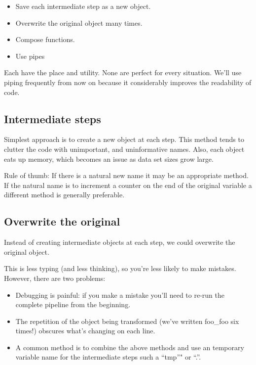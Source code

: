 \documentclass[]{book}
\providecommand{\tightlist}{%
  \setlength{\itemsep}{0pt}\setlength{\parskip}{0pt}}
\newenvironment{rmdblock}[1]
  {\begin{shaded*}
  \begin{itemize}
  \renewcommand{\labelitemi}{
    \raisebox{-.7\height}[0pt][0pt]{
      {\setkeys{Gin}{width=3em,keepaspectratio}\texttt{[image: images/\#1]}}
    }
  }
  \item
  }
  {
  \end{itemize}
  \end{shaded*}
  }
\newenvironment{rmdnote}
  {\begin{rmdblock}{note}}
  {\end{rmdblock}}
\theoremstyle{definition}
\theoremstyle{definition}
\theoremstyle{definition}
\theoremstyle{remark}
\begin{document}
\begin{itemize}
\tightlist
\item
  Save each intermediate step as a new object.
\item
  Overwrite the original object many times.
\item
  Compose functions.
\item
  Use pipes
\end{itemize}

Each have the place and utility. None are perfect for every situation.
We'll use piping frequently from now on because it considerably improves
the readability of code.

\hypertarget{intermediate-steps}{%
\subsection{Intermediate steps}\label{intermediate-steps}}

Simplest approach is to create a new object at each step. This method
tends to clutter the code with unimportant, and uninformative names.
Also, each object eats up memory, which becomes an issue as data set
sizes grow large.

Rule of thumb: If there is a natural new name it may be an appropriate
method. If the natural name is to increment a counter on the end of the
original variable a different method is generally preferable.

\hypertarget{overwrite-the-original}{%
\subsection{Overwrite the original}\label{overwrite-the-original}}

Instead of creating intermediate objects at each step, we could
overwrite the original object.

This is less typing (and less thinking), so you're less likely to make
mistakes. However, there are two problems:

\begin{itemize}
\tightlist
\item
  Debugging is painful: if you make a mistake you'll need to re-run the
  complete pipeline from the beginning.
\item
  The repetition of the object being transformed (we've written foo\_foo
  six times!) obscures what's changing on each line.
\end{itemize}

\begin{rmdnote}
A common method is to combine the above methods and use an temporary
variable name for the intermediate steps such a ``tmp''" or ``.''.
\end{rmdnote}
\end{document}
